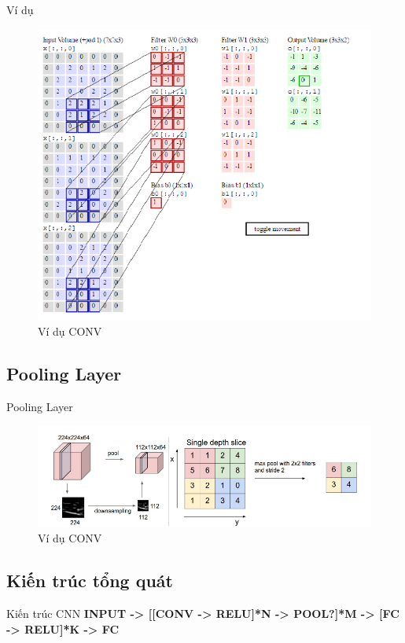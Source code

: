 \documentclass[compress]{beamer}
\begin{document}
\begin{frame}{Ví dụ}
\begin{figure}[H]
\includegraphics[scale=0.5]{img3.png}
\caption{Ví dụ CONV}
\end{figure}
\end{frame}
\subsection{Pooling Layer}
\begin{frame}{Pooling Layer}
\begin{figure}[H]
\includegraphics[scale=0.5]{img4.png}
\caption{Ví dụ CONV}
\end{figure}
\end{frame}
\subsection{Kiến trúc tổng quát}
\begin{frame}{Kiến trúc CNN}
\small{
\textbf{INPUT -> [[CONV -> RELU]*N -> POOL?]*M -> [FC -> RELU]*K -> FC}
}

\end{frame}
\end{document}
